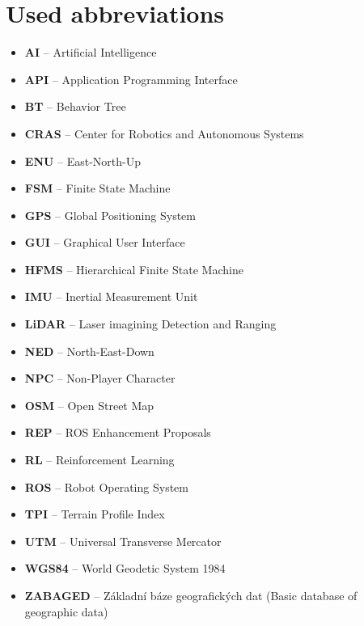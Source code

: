     \section*{Used abbreviations}
        \begin{itemize}
            \item \textbf{AI} -- Artificial Intelligence
            \item \textbf{API} -- Application Programming Interface
            \item \textbf{BT} -- Behavior Tree
            \item \textbf{CRAS} -- Center for Robotics and Autonomous Systems
            \item \textbf{ENU} -- East-North-Up
            \item \textbf{FSM} -- Finite State Machine
            \item \textbf{GPS} -- Global Positioning System
            \item \textbf{GUI} -- Graphical User Interface
            \item \textbf{HFMS} -- Hierarchical Finite State Machine
            \item \textbf{IMU} -- Inertial Measurement Unit
            \item \textbf{LiDAR} -- Laser imagining Detection and Ranging
            \item \textbf{NED} -- North-East-Down
            \item \textbf{NPC} -- Non-Player Character
            \item \textbf{OSM} -- Open Street Map
            \item \textbf{REP} -- ROS Enhancement Proposals
            \item \textbf{RL} -- Reinforcement Learning
            \item \textbf{ROS} -- Robot Operating System
            \item \textbf{TPI} -- Terrain Profile Index
            \item \textbf{UTM} -- Universal Transverse Mercator
            \item \textbf{WGS84} -- World Geodetic System 1984
            \item \textbf{ZABAGED} -- Základní báze geografických dat (Basic database of geographic data)
        \end{itemize}
    